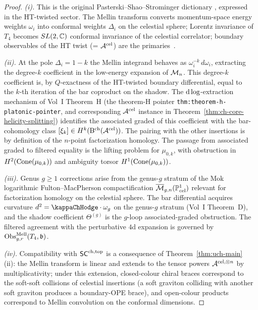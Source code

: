 \begin{proof}
\emph{(i).}
This is the original Pasterski--Shao--Strominger dictionary
\cite[\S 3]{PasterskiShaoStromingerFlatSpaceHolog}, expressed in
the HT-twisted sector. The Mellin transform converts momentum-space
energy weights $\omega_i$ into conformal weights $\Delta_i$ on the
celestial sphere; Lorentz invariance of $T_4$ becomes $SL(2,\mathbb C)$
conformal invariance of the celestial correlator; boundary
observables of the HT twist (= $\mathcal A^{\mathrm{cel}}$) are the
primaries~\cite[\S 2]{StromingerLectures2018}.

\emph{(ii).}
At the pole $\Delta_i = 1 - k$ the Mellin integrand behaves as
$\omega_i^{-k}\,d\omega_i$, extracting the degree-$k$ coefficient in
the low-energy expansion of $\mathcal M_n$. This degree-$k$ coefficient is,
by $Q$-exactness of the HT-twisted boundary differential, equal to
the $k$-th iteration of the bar coproduct on the shadow. The
$\mathrm d\log$-extraction mechanism of Vol~I Theorem~H (the theorem-H pointer
\texttt{thm:theorem-h-platonic-pointer}, and corresponding
$\mathcal A^{\mathrm{cel}}$ instance in Theorem~\ref{thm:ch-core-helicity-splitting})
identifies the associated graded of this coefficient with the
bar-cohomology class $[\xi_k] \in H^k(\mathrm B^{\mathrm{ch}}(\mathcal A^{\mathrm{cel}}))$.
The pairing with the other insertions is by definition of the
$n$-point factorization homology. The passage from associated graded
to filtered equality is the lifting problem for $\mu_{0,k}$, with
obstruction in $H^2(\operatorname{Cone}(\mu_{0,k}))$ and ambiguity torsor
$H^1(\operatorname{Cone}(\mu_{0,k}))$.

\emph{(iii).}
Genus $g \geq 1$ corrections arise from the genus-$g$ stratum of the
Mok~\cite{Mok25LogFM} logarithmic Fulton--MacPherson compactification
$\overline{\mathcal M}_{g,n}(\mathbb P^1_{\text{cel}})$ relevant for factorization
homology on the celestial sphere. The bar differential acquires
curvature $d^2 = \kap \cdot \omega_g$ on the genus-$g$ stratum
(Vol~I Theorem~D), and the shadow coefficient $\Theta^{(g)}$ is the
$g$-loop associated-graded obstruction. The filtered agreement with
the perturbative $4$d expansion is governed by
$\operatorname{Obs}^{\mathrm{Mell}}_{g,r}(T_4,\mathfrak b)$.

\emph{(iv).}
Compatibility with $\mathsf{SC}^{\mathrm{ch,top}}$ is a consequence of
Theorem~\ref{thm:uch-main}(ii): the Mellin transform is linear and
extends to the tensor powers $\mathcal A^{\mathrm{cel},\otimes n}$ by
multiplicativity; under this extension, closed-colour chiral braces
correspond to the soft-soft collisions of celestial insertions (a
soft graviton colliding with another soft graviton produces a
boundary-OPE brace), and open-colour products correspond to Mellin
convolution on the conformal dimensions.
\end{proof}

